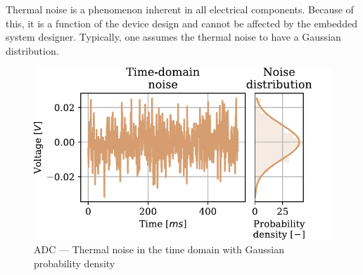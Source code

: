 Thermal noise is a phenomenon inherent in all electrical components. Because of this, it is a function of the device design and cannot be affected by the embedded system designer. Typically, one assumes the thermal noise to have a Gaussian distribution.

\begin{figure}
  \centering
  \includegraphics[scale=0.72]{figures/electronics/adc/plot_thermerr}
  \caption[ADC thermal noise]{ADC --- Thermal noise in the time domain with Gaussian probability density~\cite{hall2020fund}%
    \label{fig:plot_themerr}}
\end{figure}
